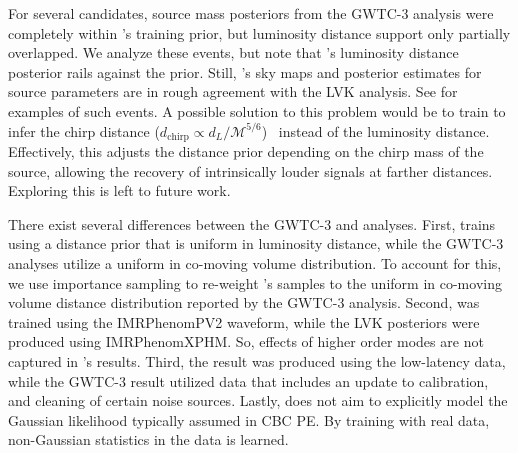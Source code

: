 \begin{refsection}
For several candidates, source mass posteriors from the GWTC-3 analysis were completely within \amplfi's training prior, but luminosity distance support only partially overlapped. 
We analyze these events, but note that \amplfi's luminosity distance posterior rails against the prior. 
Still, \amplfi's sky maps and posterior estimates for source parameters are in rough agreement with the LVK analysis. 
See  for examples of such events. 
A possible solution to this problem would be to train \amplfi to infer the chirp distance ($d_{\mathrm{chirp}} \propto d_L/\mathcal{M}^{5/6}$)~\cite{Roulet_2022, Brady_2008} instead of the luminosity distance. 
Effectively, this adjusts the distance prior depending on the chirp mass of the source, allowing the recovery of intrinsically louder signals at farther distances. 
Exploring this is left to future work.

There exist several differences between the GWTC-3 and \amplfi analyses. 
First, \amplfi trains using a distance prior that is uniform in luminosity distance, while the GWTC-3 analyses utilize a uniform in co-moving volume distribution. 
To account for this, we use importance sampling to re-weight \amplfi's samples to the uniform in co-moving volume distance distribution reported by the GWTC-3 analysis. 
Second, \amplfi was trained using the IMRPhenomPV2 waveform, while the LVK posteriors were produced using IMRPhenomXPHM. 
So, effects of higher order modes are not captured in \amplfi's results. 
Third, the \amplfi result was produced using the low-latency data, while the GWTC-3 result utilized data that includes an update to calibration, and cleaning of certain noise sources. 
Lastly, \amplfi does not aim to explicitly model the Gaussian likelihood typically assumed in CBC PE. 
By training with real data, non-Gaussian statistics in the data is learned.


\end{refsection}
